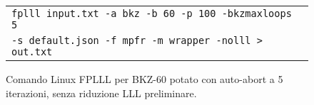 \begin{figure}[h]
    \centering
    \begin{tabular}{l}
        \texttt{fplll input.txt -a bkz -b 60 -p 100 -bkzmaxloops 5} \\
        \texttt{-s default.json -f mpfr -m wrapper -nolll > out.txt} \\
    \end{tabular}
    \caption[Comando Linux FPLLL per BKZ-60.]
    {Comando Linux FPLLL per BKZ-60 potato con auto-abort a 5 iterazioni, 
    senza riduzione LLL preliminare.}
    \label{fig:bkzcommand2}
\end{figure}